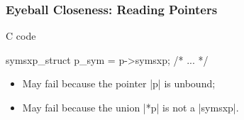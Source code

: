 \documentclass{beamer}
\begin{document}
\begin{frame}[fragile]
    \label{frame:reading:pointers}
    \frametitle{Eyeball Closeness: Reading Pointers}

    \begin{changemargin}{-5mm}{-5mm}

\begin{minipage}{.6\textwidth}
    {C code}
\begin{ccode}
symsxp_struct p_sym = p->symsxp;
/* ... */
\end{ccode}
\end{minipage}
    \begin{minipage}{.45\textwidth}
    \begin{itemize}
        \item May fail because the pointer \cinline|p| is unbound;
        \item May fail because the union \cinline|*p| is not a \cinline|symsxp|.
    \end{itemize}
    \end{minipage}

\vfill


\end{changemargin}
\end{frame}
\end{document}
